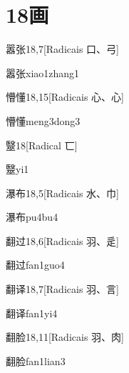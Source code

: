 
\section*{18画}

\begin{entry}{嚣张}{18,7}[Radicais ⼝、⼸]
  \begin{phonetics}{嚣张}{xiao1zhang1}
  \end{phonetics}
\end{entry}

\begin{entry}{懵懂}{18,15}[Radicais ⼼、⼼]
  \begin{phonetics}{懵懂}{meng3dong3}
  \end{phonetics}
\end{entry}

\begin{entry}{毉}{18}[Radical ⼖]
  \begin{phonetics}{毉}{yi1}
  \end{phonetics}
\end{entry}

\begin{entry}{瀑布}{18,5}[Radicais ⽔、⼱]
  \begin{phonetics}{瀑布}{pu4bu4}
  \end{phonetics}
\end{entry}

\begin{entry}{翻过}{18,6}[Radicais ⽻、⾡]
  \begin{phonetics}{翻过}{fan1guo4}
  \end{phonetics}
\end{entry}

\begin{entry}{翻译}{18,7}[Radicais ⽻、⾔]
  \begin{phonetics}{翻译}{fan1yi4}
  \end{phonetics}
\end{entry}

\begin{entry}{翻脸}{18,11}[Radicais ⽻、⾁]
  \begin{phonetics}{翻脸}{fan1lian3}
  \end{phonetics}
\end{entry}


